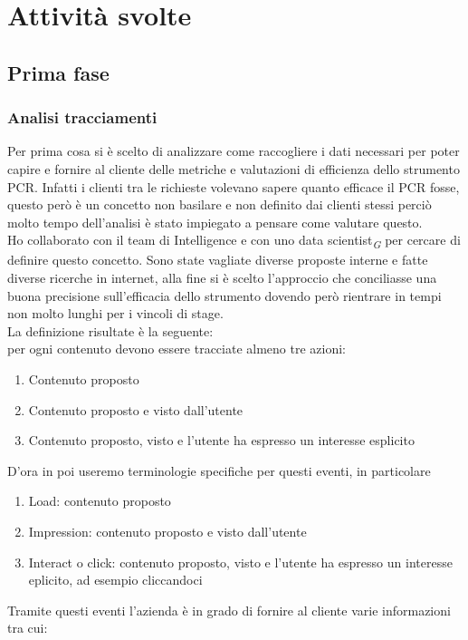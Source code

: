 \documentclass[a4paper, 12pt, twoside, openright]{book}
\newcommand{\gloss}[1]{#1\textsubscript{\textit{\tiny{G}}}}
\begin{document}
\newpage{}
\section{Attività svolte}

\subsection{Prima fase}

\subsubsection{Analisi tracciamenti}
\label{analisi-pcr}
Per prima cosa si è scelto di analizzare come raccogliere i dati necessari per poter capire e fornire al cliente delle metriche e valutazioni di efficienza dello strumento PCR. Infatti i clienti tra le richieste volevano sapere quanto efficace il PCR fosse, questo però è un concetto non basilare e non definito dai clienti stessi perciò molto tempo dell'analisi è stato impiegato a pensare come valutare questo.\\
Ho collaborato con il team di Intelligence e con uno \gloss{data scientist} per cercare di definire questo concetto. Sono state vagliate diverse proposte interne e fatte diverse ricerche in internet, alla fine si è scelto l'approccio che conciliasse una buona precisione sull'efficacia dello strumento dovendo però rientrare in tempi non molto lunghi per i vincoli di stage.\\
La definizione risultate è la seguente:\\
per ogni contenuto devono essere tracciate almeno tre azioni:
\begin{enumerate}
\item Contenuto proposto
\item Contenuto proposto e visto dall'utente
\item Contenuto proposto, visto e l'utente ha espresso un interesse esplicito
\end{enumerate}
D'ora in poi useremo terminologie specifiche per questi eventi, in particolare
\begin{enumerate}
\item Load: contenuto proposto
\item Impression: contenuto proposto e visto dall'utente
\item Interact o click: contenuto proposto, visto e l'utente ha espresso un interesse eplicito, ad esempio cliccandoci
\end{enumerate}
Tramite questi eventi l'azienda è in grado di fornire al cliente varie informazioni tra cui:
\end{document}
